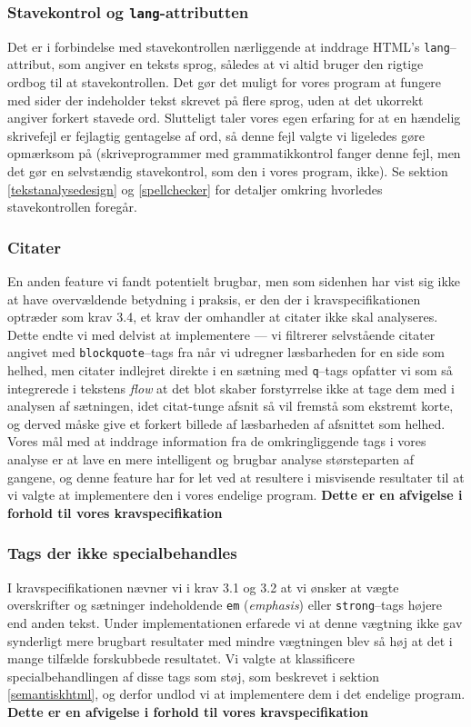 \documentclass[a4paper,oneside]{memoir}
\begin{document}
\subsubsection{Stavekontrol og \texttt{lang}-attributten}
\label{stavekontrolsprog}
Det er i forbindelse med stavekontrollen nærliggende at inddrage
HTML's \texttt{lang}--attribut, som angiver en teksts sprog, således
at vi altid bruger den rigtige ordbog til at stavekontrollen. Det gør
det muligt for vores program at fungere med sider der indeholder tekst
skrevet på flere sprog, uden at det ukorrekt angiver forkert stavede
ord. Slutteligt taler vores egen erfaring for at en hændelig
skrivefejl er fejlagtig gentagelse af ord, så denne fejl valgte vi
ligeledes gøre opmærksom på (skriveprogrammer med grammatikkontrol
fanger denne fejl, men det gør en selvstændig stavekontrol, som den i
vores program, ikke). Se sektion \ref{tekstanalysedesign} og
\ref{spellchecker} for detaljer omkring hvorledes stavekontrollen
foregår.

\subsubsection{Citater}
\label{citater}
En anden feature vi fandt potentielt brugbar, men som sidenhen har
vist sig ikke at have overvældende betydning i praksis, er den der i
kravspecifikationen optræder som krav 3.4, et krav der omhandler at
citater ikke skal analyseres. Dette endte vi med delvist at
implementere --- vi filtrerer selvstående citater angivet med
\texttt{blockquote}--tags fra når vi udregner læsbarheden for en side
som helhed, men citater indlejret direkte i en sætning med
\texttt{q}--tags opfatter vi som så integrerede i tekstens
\textit{flow} at det blot skaber forstyrrelse ikke at tage dem med i
analysen af sætningen, idet citat-tunge afsnit så vil fremstå som
ekstremt korte, og derved måske give et forkert billede af læsbarheden
af afsnittet som helhed. Vores mål med at inddrage information fra de
omkringliggende tags i vores analyse er at lave en mere intelligent og
brugbar analyse størsteparten af gangene, og denne feature har for let
ved at resultere i misvisende resultater til at vi valgte at
implementere den i vores endelige program. \textbf{Dette er en
  afvigelse i forhold til vores kravspecifikation}

\subsubsection{Tags der ikke specialbehandles}
\label{ejspecialbehandling}
I kravspecifikationen nævner vi i krav 3.1 og 3.2 at vi ønsker at
vægte overskrifter og sætninger indeholdende \texttt{em}
(\textit{emphasis}) eller \texttt{strong}--tags højere end anden
tekst. Under implementationen erfarede vi at denne vægtning ikke gav
synderligt mere brugbart resultater med mindre vægtningen blev så høj
at det i mange tilfælde forskubbede resultatet. Vi valgte at
klassificere specialbehandlingen af disse tags som støj, som
beskrevet i sektion \ref{semantiskhtml}, og derfor undlod vi at
implementere dem i det endelige program. \textbf{Dette er en afvigelse
  i forhold til vores kravspecifikation}
\end{document}
